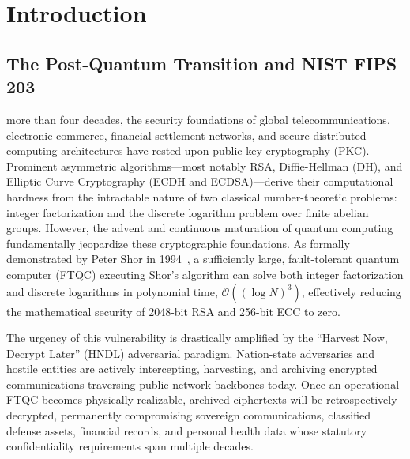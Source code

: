 \section{Introduction}
\label{sec:introduction}

\subsection{The Post-Quantum Transition and NIST FIPS 203}
\label{sec:intro_pqc_transition}

 more than four decades, the security foundations of global telecommunications, electronic commerce, financial settlement networks, and secure distributed computing architectures have rested upon public-key cryptography (PKC). Prominent asymmetric algorithms---most notably RSA, Diffie-Hellman (DH), and Elliptic Curve Cryptography (ECDH and ECDSA)---derive their computational hardness from the intractable nature of two classical number-theoretic problems: integer factorization and the discrete logarithm problem over finite abelian groups. However, the advent and continuous maturation of quantum computing fundamentally jeopardize these cryptographic foundations. As formally demonstrated by Peter Shor in 1994~\cite{shor1994}, a sufficiently large, fault-tolerant quantum computer (FTQC) executing Shor's algorithm can solve both integer factorization and discrete logarithms in polynomial time, $\mathcal{O}((\log N)^3)$, effectively reducing the mathematical security of 2048-bit RSA and 256-bit ECC to zero.

The urgency of this vulnerability is drastically amplified by the ``Harvest Now, Decrypt Later'' (HNDL) adversarial paradigm. Nation-state adversaries and hostile entities are actively intercepting, harvesting, and archiving encrypted communications traversing public network backbones today. Once an operational FTQC becomes physically realizable, archived ciphertexts will be retrospectively decrypted, permanently compromising sovereign communications, classified defense assets, financial records, and personal health data whose statutory confidentiality requirements span multiple decades.

